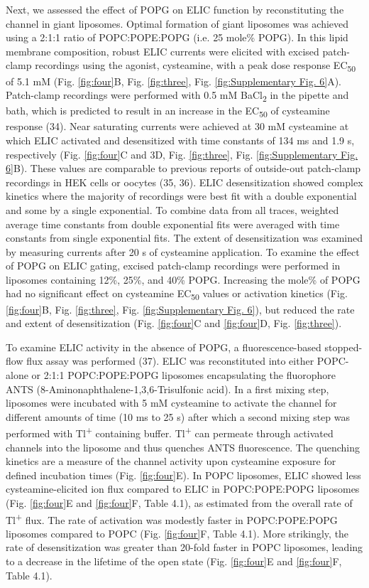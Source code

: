 Next, we assessed the effect of POPG on ELIC function by reconstituting
the channel in giant liposomes. Optimal formation of giant liposomes was
achieved using a 2:1:1 ratio of POPC:POPE:POPG (i.e. 25 mole\% POPG). In
this lipid membrane composition, robust ELIC currents were elicited with
excised patch-clamp recordings using the agonist, cysteamine, with a
peak dose response EC\textsubscript{50} of 5.1 mM (Fig. \ref{fig:four}B, Fig. \ref{fig:three},
Fig. \ref{fig:Supplementary Fig. 6}A). Patch-clamp recordings were performed with 0.5
mM BaCl\textsubscript{2} in the pipette and bath, which is predicted to
result in an increase in the EC\textsubscript{50} of cysteamine response
(34). Near saturating currents were achieved at 30 mM cysteamine at
which ELIC activated and desensitized with time constants of 134 ms and
1.9 s, respectively (Fig. \ref{fig:four}C and 3D,  Fig. \ref{fig:three}, Fig. \ref{fig:Supplementary Fig. 6}B).
These values are comparable to previous reports of outside-out
patch-clamp recordings in HEK cells or oocytes (35, 36). ELIC
desensitization showed complex kinetics where the majority of recordings
were best fit with a double exponential and some by a single
exponential. To combine data from all traces, weighted average time
constants from double exponential fits were averaged with time constants
from single exponential fits. The extent of desensitization was examined
by measuring currents after 20 s of cysteamine application. To examine
the effect of POPG on ELIC gating, excised patch-clamp recordings were
performed in liposomes containing 12\%, 25\%, and 40\% POPG. Increasing
the mole\% of POPG had no significant effect on cysteamine
EC\textsubscript{50} values or activation kinetics (Fig. \ref{fig:four}B, Fig. \ref{fig:three},
Fig. \ref{fig:Supplementary Fig. 6}), but reduced the rate and extent of
desensitization (Fig. \ref{fig:four}C and  \ref{fig:four}D,  Fig. \ref{fig:three}).

To examine ELIC activity in the absence of POPG, a fluorescence-based
stopped-flow flux assay was performed (37). ELIC was reconstituted into
either POPC-alone or 2:1:1 POPC:POPE:POPG liposomes encapsulating the
fluorophore ANTS (8-Aminonaphthalene-1,3,6-Trisulfonic acid). In a first
mixing step, liposomes were incubated with 5 mM cysteamine to activate
the channel for different amounts of time (10 ms to 25 s) after which a
second mixing step was performed with Tl\textsuperscript{+} containing
buffer. Tl\textsuperscript{+} can permeate through activated channels
into the liposome and thus quenches ANTS fluorescence. The quenching
kinetics are a measure of the channel activity upon cysteamine exposure
for defined incubation times (Fig. \ref{fig:four}E). In POPC liposomes, ELIC showed
less cysteamine-elicited ion flux compared to ELIC in POPC:POPE:POPG
liposomes (Fig. \ref{fig:four}E and \ref{fig:four}F, Table 4.1), as estimated from the overall rate
of Tl\textsuperscript{+} flux. The rate of activation was modestly
faster in POPC:POPE:POPG liposomes compared to POPC (Fig. \ref{fig:four}F, Table 4.1).
More strikingly, the rate of desensitization was greater than 20-fold
faster in POPC liposomes, leading to a decrease in the lifetime of the
open state (Fig. \ref{fig:four}E and \ref{fig:four}F, Table 4.1).

